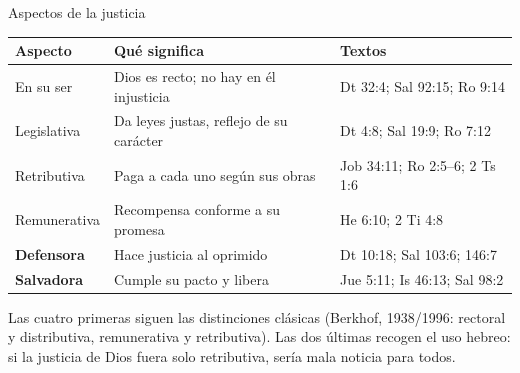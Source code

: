 \documentclass[hyperref={bookmarks=false},aspectratio=169]{beamer}
\newcommand{\destacar}[1]{\textbf{\textcolor{azul}{#1}}}
\begin{document}
\begin{frame}{Aspectos de la justicia}
\scriptsize\renewcommand{\arraystretch}{1.2}
\begin{tabular}{@{}>{\RaggedRight\arraybackslash}p{2.3cm}>{\RaggedRight\arraybackslash}p{5.0cm}>{\RaggedRight\arraybackslash}p{4.6cm}@{}}
\toprule
\textbf{Aspecto} & \textbf{Qué significa} & \textbf{Textos} \\ \midrule
En su ser & Dios es recto; no hay en él injusticia & Dt 32:4; Sal 92:15; Ro 9:14 \\
Legislativa & Da leyes justas, reflejo de su carácter & Dt 4:8; Sal 19:9; Ro 7:12 \\
Retributiva & Paga a cada uno según sus obras & Job 34:11; Ro 2:5--6; 2 Ts 1:6 \\
Remunerativa & Recompensa conforme a su promesa & He 6:10; 2 Ti 4:8 \\
\destacar{Defensora} & Hace justicia al oprimido & Dt 10:18; Sal 103:6; 146:7 \\
\destacar{Salvadora} & Cumple su pacto y libera & Jue 5:11; Is 46:13; Sal 98:2 \\
\bottomrule
\end{tabular}\par\medskip
\small Las cuatro primeras siguen las distinciones clásicas (Berkhof, 1938/1996: rectoral y distributiva, remunerativa y retributiva). Las dos últimas recogen el uso hebreo: si la justicia de Dios fuera solo retributiva, sería mala noticia para todos.
\end{frame}
\end{document}
